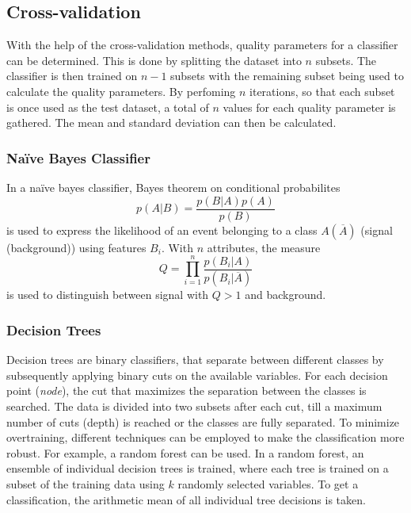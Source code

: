 \subsection{Cross-validation}
\label{sec:cross-validation}
With the help of the cross-validation methods, quality parameters for a classifier can be determined. This is done by splitting the dataset into $n$ subsets. The classifier is then trained on $n-1$ subsets with the
remaining subset being used to calculate the quality parameters. By perfoming $n$ iterations, so that each subset is once used as the test dataset, a total of $n$ values for each quality parameter is
gathered. The mean and standard deviation can then be calculated.

\subsubsection{Na\"ive Bayes Classifier}
\label{subsec:Bayes}
In a na\"ive bayes classifier, Bayes theorem on conditional probabilites
\begin{equation}
    p(A|B) = \frac{p(B|A)p(A)}{p(B)}
    \label{eq:Bayes}
\end{equation}
is used to express the likelihood of an event belonging to a class $A(\overline{A})$ (signal (background)) using features $B_i$.
With $n$ attributes, the measure 
\begin{equation}
    Q = \prod_{i=1}^{n} \frac{p(B_i|A)}{p(B_i|\overline{A})}
\end{equation}
is used to distinguish between signal with $Q > 1$ and background.

\subsubsection{Decision Trees}
\label{subsec:decision_trees}
Decision trees are binary classifiers, that separate between different classes by subsequently applying binary cuts on the available variables. 
For each decision point (\textit{node}), the cut that maximizes the separation between the classes is searched. The data is divided into two subsets after each cut, till a
maximum number of cuts (depth) is reached or the classes are fully separated.
To minimize overtraining, different techniques can be employed to make the classification more robust. 
For example, a random forest can be used. In a random forest, an ensemble of individual decision trees is trained, where each tree is trained on a subset of the training data
using $k$ randomly selected variables. To get a classification, the arithmetic mean of all individual tree decisions is taken.

